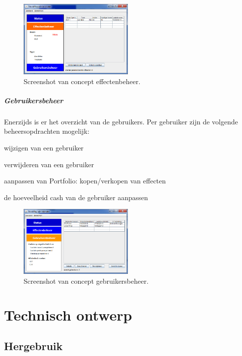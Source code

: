 \begin{figure}[h!]
	\centering
		\includegraphics[width=0.5\textwidth]{images/ontwerp/screenshot_app_effecten}
	\caption{Screenshot van concept effectenbeheer.}
\end{figure}

\paragraph{Gebruikersbeheer}Enerzijds is er het overzicht van de gebruikers. Per gebruiker zijn de volgende beheersopdrachten mogelijk: 
\begin{itemize_compact}
	\item{wijzigen van een gebruiker}
	\item{verwijderen van een gebruiker}
	\item{aanpassen van Portfolio: kopen/verkopen van effecten}
	\item{de hoeveelheid cash van de gebruiker aanpassen}
\end{itemize_compact}

\begin{figure}[h!]
	\centering
		\includegraphics[width=0.5\textwidth]{images/ontwerp/screenshot_app_gebruikers}
	\caption{Screenshot van concept gebruikersbeheer.}
\end{figure}


%
%

\chapter{Technisch ontwerp}

\section{Hergebruik}


